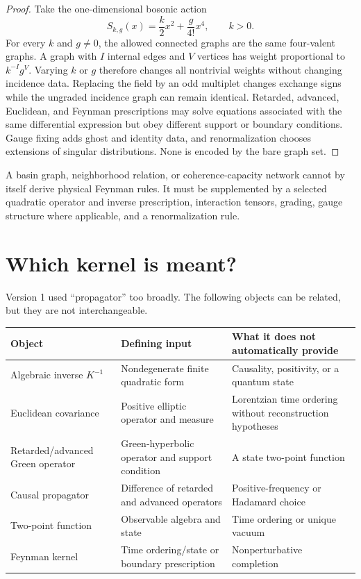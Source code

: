\documentclass[11pt,a4paper]{article}
\begin{document}
\begin{proof}
Take the one-dimensional bosonic action
\[
 S_{k,g}(x)=\frac{k}{2}x^2+\frac{g}{4!}x^4,
 \qquad k>0.
\]
For every \(k\) and \(g\neq0\), the allowed connected graphs are the same
four-valent graphs.  A graph with \(I\) internal edges and \(V\) vertices
has weight proportional to \(k^{-I}g^V\).  Varying \(k\) or \(g\)
therefore changes all nontrivial weights without changing incidence data.
Replacing the field by an odd multiplet changes exchange signs while the
ungraded incidence graph can remain identical.  Retarded, advanced,
Euclidean, and Feynman prescriptions may solve equations associated with
the same differential expression but obey different support or boundary
conditions.  Gauge fixing adds ghost and identity data, and
renormalization chooses extensions of singular distributions.  None is
encoded by the bare graph set.
\end{proof}

\begin{corollary}
A basin graph, neighborhood relation, or coherence-capacity network cannot
by itself derive physical Feynman rules.  It must be supplemented by a
selected quadratic operator and inverse prescription, interaction tensors,
grading, gauge structure where applicable, and a renormalization rule.
\end{corollary}

\section{Which kernel is meant?}
\label{sec:quantum-boundary}

Version 1 used ``propagator'' too broadly.  The following objects can be
related, but they are not interchangeable.

\begin{center}
\small
\begin{tabular}{>{\raggedright\arraybackslash}p{}
                >{\raggedright\arraybackslash}p{}
                >{\raggedright\arraybackslash}p{}}
\toprule
Object & Defining input & What it does not automatically provide\\
\midrule
Algebraic inverse \(K^{-1}\) &
Nondegenerate finite quadratic form &
Causality, positivity, or a quantum state\\
Euclidean covariance &
Positive elliptic operator and measure &
Lorentzian time ordering without reconstruction hypotheses\\
Retarded/advanced Green operator &
Green-hyperbolic operator and support condition &
A state two-point function\\
Causal propagator &
Difference of retarded and advanced operators &
Positive-frequency or Hadamard choice\\
Two-point function &
Observable algebra and state &
Time ordering or unique vacuum\\
Feynman kernel &
Time ordering/state or boundary prescription &
Nonperturbative completion\\
\bottomrule
\end{tabular}
\end{center}
\end{document}
